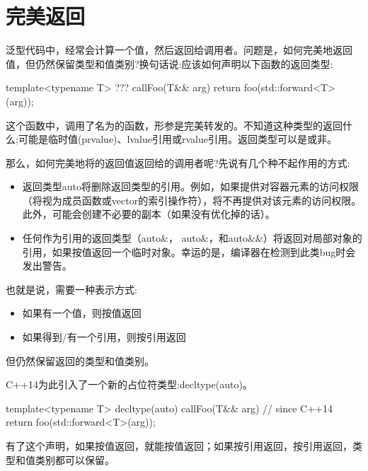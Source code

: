 \section{完美返回}
泛型代码中，经常会计算一个值，然后返回给调用者。问题是，如何完美地返回值，但仍然保留类型和值类别?换句话说:应该如何声明以下函数的返回类型:

\begin{cppcode}
template<typename T>
??? callFoo(T&& arg)
{
	return foo(std::forward<T>(arg));
}
\end{cppcode}

这个函数中，调用了名为的函数，形参是完美转发的。不知道这种类型的返回什么;可能是临时值(prvalue)、lvalue引用或rvalue引用。返回类型可以是或非。

那么，如何完美地将的返回值返回给的调用者呢?先说有几个种不起作用的方式:

\begin{itemize}
	\item 返回类型auto将删除返回类型的引用。例如，如果提供对容器元素的访问权限（将视为成员函数或vector的索引操作符），将不再提供对该元素的访问权限。此外，可能会创建不必要的副本（如果没有优化掉的话）。
	\item 任何作为引用的返回类型（auto\&，  auto\&，和auto\&\&）将返回对局部对象的引用，如果按值返回一个临时对象。幸运的是，编译器在检测到此类bug时会发出警告。
\end{itemize}

也就是说，需要一种表示方式:

\begin{itemize}
	\item 如果有一个值，则按值返回
	\item 如果得到/有一个引用，则按引用返回
\end{itemize}

但仍然保留返回的类型和值类别。

C++14为此引入了一个新的占位符类型:decltype(auto)。

\begin{cppcode}
template<typename T>
decltype(auto) callFoo(T&& arg) // since C++14
{
	return foo(std::forward<T>(arg));
}
\end{cppcode}

有了这个声明，如果按值返回，就能按值返回；如果按引用返回，按引用返回，类型和值类别都可以保留。











































